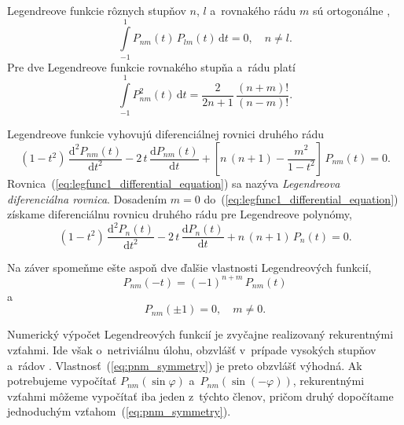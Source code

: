 \documentclass[a4paper,12pt]{book}
\newcommand{\diff}{\mathrm d}
\begin{document}
Legendreove funkcie rôznych stupňov $n$, $l$ a~rovnakého rádu $m$ sú
ortogonálne \parencite{Freeden2009},
%
\begin{equation}
\label{eq:pnm_orthogonality}
\int\limits_{-1}^{1} P_{nm}(t) \, P_{lm}(t) \, \diff t = 0{,} \quad n \neq l{.}
\end{equation}
%
Pre dve Legendreove funkcie rovnakého stupňa a~rádu platí
\begin{equation}
\label{eq:pnm_times_pnm}
\int\limits_{-1}^{1} P^2_{nm}(t) \, \diff t = \frac{2}{2n + 1} \, \frac{(n 
+ m)!}{(n - m)!}{.}
\end{equation}

Legendreove funkcie vyhovujú diferenciálnej rovnici druhého rádu 
\parencite{SansoGeoidDetermination}
%
\begin{equation}
\label{eq:legfunc1_differential_equation}
(1 - t^2) \, \frac{\diff^2 P_{nm}(t)}{\diff t^2} - 2 \, t \, \frac{\diff 
P_{nm}(t)}{\diff t} + \left[ n \, (n + 1) - \frac{m^2}{1 - t^2} \right] \, 
P_{nm}(t) = 0{.}
\end{equation}
%
Rovnica~(\ref{eq:legfunc1_differential_equation}) sa nazýva \emph{Legendreova 
diferenciálna rovnica}.  Dosadením $m = 0$ 
do~(\ref{eq:legfunc1_differential_equation}) získame diferenciálnu rovnicu 
druhého rádu pre Legendreove polynómy,
%
\begin{equation}
\label{eq:legpol_differential_equation}
(1 - t^2) \, \frac{\diff^2 P_n(t)}{\diff t^2} - 2 \, t \, \frac{\diff 
P_n(t)}{\diff t} + n \, (n + 1) \, P_n(t) = 0{.}
\end{equation}

Na záver spomeňme ešte aspoň dve ďalšie vlastnosti Legendreových funkcií,
%
\begin{equation}
\label{eq:pnm_symmetry}
P_{nm}(-t) = (-1)^{n + m} \, P_{nm}(t)
\end{equation}
%
a
%
\begin{equation}
P_{nm}(\pm1) = 0{,} \quad m \neq 0{.}
\end{equation}

Numerický výpočet Legendreových funkcií je zvyčajne realizovaný rekurentnými 
vzťahmi.  Ide však o~netriviálnu úlohu, obzvlášť v~prípade vysokých stupňov 
a~rádov \parencite{Holmes2002a,Fukushima2012a,Ishioka2018}.  
Vlastnosť~(\ref{eq:pnm_symmetry}) je preto obzvlášť výhodná.  Ak potrebujeme 
vypočítať $P_{nm}(\sin\varphi)$ a~$P_{nm}(\sin(-\varphi))$, rekurentnými 
vzťahmi môžeme vypočítať iba jeden z~týchto členov, pričom druhý dopočítame 
jednoduchým vzťahom~(\ref{eq:pnm_symmetry}).
\end{document}
